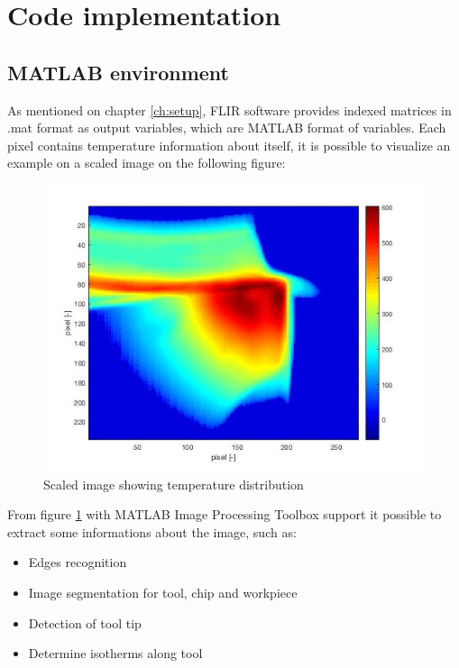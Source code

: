 \section{Code implementation}
\label{sec:codeimpl}

	\subsection{MATLAB environment}
		As mentioned on chapter \ref{ch:setup}, FLIR software provides indexed matrices in .mat format as output variables, which are MATLAB format of variables. Each pixel contains temperature information about itself, it is possible to visualize an example on a scaled image on the following figure:

		\begin{figure}[H]
			\centering
			\captionsetup{justification=centering}
			\includegraphics[scale=0.6]{Cap4/TempDist.jpg}
			\caption{Scaled image showing temperature distribution}
			\label{fig:tempdist}
		\end{figure}

		From figure \ref{fig:tempdist} with MATLAB Image Processing Toolbox support it possible to extract some informations about the image, such as:

		\begin{itemize}
			\item Edges recognition
			\item Image segmentation for tool, chip and workpiece
			\item Detection of tool tip
			\item Determine isotherms along tool
		\end{itemize}
	
